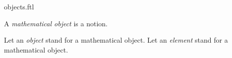 \documentclass{stex}
\begin{document}
\begin{smodule}{objects.ftl}


\begin{fakeforthel}
  \begin{signature}
    A \emph{mathematical object} is a notion.
    
    Let an \emph{object} stand for a mathematical object.
    Let an \emph{element} stand for a mathematical object.
  \end{signature}
\end{fakeforthel}

\end{smodule}
\end{document}
